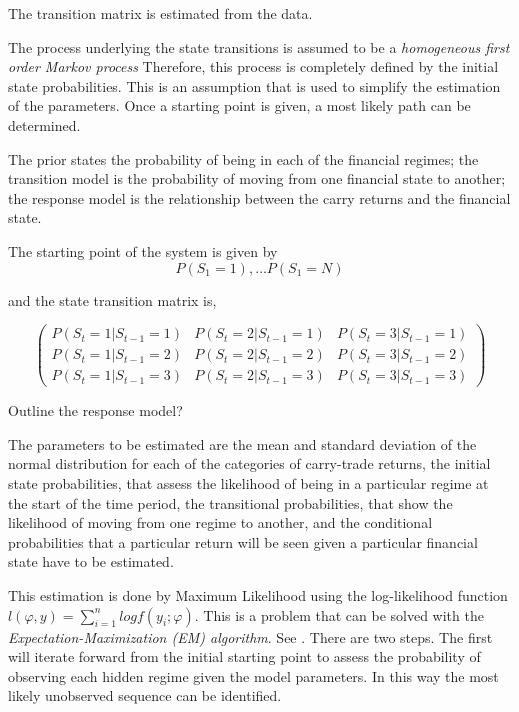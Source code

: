 \documentclass[12pt, a4paper, oneside]{article} %
\begin{document}
The transition matrix is estimated from the data. 

The process underlying the state transitions is assumed to be a \emph{homogeneous first order Markov process}  Therefore, this process is completely defined by the initial state probabilities. This is an assumption that is used to simplify the estimation of the parameters. Once a starting point is given, a most likely path can be determined. 

The prior states the probability of being in each of the financial regimes; the transition model is the probability of moving from one financial state to another; the response model is the relationship between the carry returns and the financial state.  

The starting point of the system is given by
\begin{equation*}
P(S_1 = 1), \dots P(S_1 = N)
\end{equation*}

and the state transition matrix is, 

\begin{equation*}
\begin{pmatrix}
P(S_t = 1|S_{t-1}=1) & P(S_t = 2|S_{t-1}=1) & P(S_t = 3|S_{t-1}=1)\\
P(S_t = 1|S_{t-1}=2) & P(S_t = 2|S_{t-1}=2) & P(S_t = 3|S_{t-1}=2)\\
P(S_t = 1|S_{t-1}=3) & P(S_t = 2|S_{t-1}=3) & P(S_t = 3|S_{t-1}=3)
\end{pmatrix}
\end{equation*}

Outline the response model?

The parameters to be estimated are the mean and standard deviation  of the normal distribution for each of the categories of carry-trade returns, the initial state probabilities, that assess the likelihood of being in a particular regime at the start of the time period, the transitional probabilities, that show the likelihood of moving from one regime to another, and the conditional probabilities that a particular return will be seen given a particular financial state have to be estimated.  

This estimation is done by Maximum Likelihood using the log-likelihood function $l(\varphi, y) = \sum_{i=1}^n log f(y_i; \varphi)$. This is a problem that can be solved with the \emph{Expectation-Maximization (EM) algorithm}.  See \citet{dempster1977maximum}. There are two steps. The first will iterate forward from the initial starting point to assess the probability of observing each hidden regime given the model parameters.  In this way the most likely unobserved sequence can be identified.  
\end{document}
